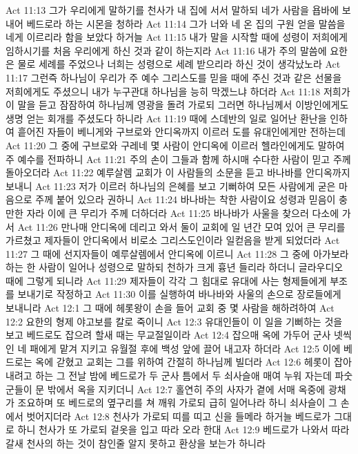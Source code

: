 Act 11:13  그가 우리에게 말하기를 천사가 내 집에 서서 말하되 네가 사람을 욥바에 보내어 베드로라 하는 시몬을 청하라
Act 11:14  그가 너와 네 온 집의 구원 얻을 말씀을 네게 이르리라 함을 보았다 하거늘
Act 11:15  내가 말을 시작할 때에 성령이 저희에게 임하시기를 처음 우리에게 하신 것과 같이 하는지라
Act 11:16  내가 주의 말씀에 요한은 물로 세례를 주었으나 너희는 성령으로 세례 받으리라 하신 것이 생각났노라
Act 11:17  그런즉 하나님이 우리가 주 예수 그리스도를 믿을 때에 주신 것과 같은 선물을 저희에게도 주셨으니 내가 누구관대 하나님을 능히 막겠느냐 하더라
Act 11:18  저희가 이 말을 듣고 잠잠하여 하나님께 영광을 돌려 가로되 그러면 하나님께서 이방인에게도 생명 얻는 회개를 주셨도다 하니라
Act 11:19  때에 스데반의 일로 일어난 환난을 인하여 흩어진 자들이 베니게와 구브로와 안디옥까지 이르러 도를 유대인에게만 전하는데
Act 11:20  그 중에 구브로와 구레네 몇 사람이 안디옥에 이르러 헬라인에게도 말하여 주 예수를 전파하니
Act 11:21  주의 손이 그들과 함께 하시매 수다한 사람이 믿고 주께 돌아오더라
Act 11:22  예루살렘 교회가 이 사람들의 소문을 듣고 바나바를 안디옥까지 보내니
Act 11:23  저가 이르러 하나님의 은혜를 보고 기뻐하여 모든 사람에게 굳은 마음으로 주께 붙어 있으라 권하니
Act 11:24  바나바는 착한 사람이요 성령과 믿음이 충만한 자라 이에 큰 무리가 주께 더하더라
Act 11:25  바나바가 사울을 찾으러 다소에 가서
Act 11:26  만나매 안디옥에 데리고 와서 둘이 교회에 일 년간 모여 있어 큰 무리를 가르쳤고 제자들이 안디옥에서 비로소 그리스도인이라 일컫음을 받게 되었더라
Act 11:27  그 때에 선지자들이 예루살렘에서 안디옥에 이르니
Act 11:28  그 중에 아가보라 하는 한 사람이 일어나 성령으로 말하되 천하가 크게 흉년 들리라 하더니 글라우디오 때에 그렇게 되니라
Act 11:29  제자들이 각각 그 힘대로 유대에 사는 형제들에게 부조를 보내기로 작정하고
Act 11:30  이를 실행하여 바나바와 사울의 손으로 장로들에게 보내니라
Act 12:1  그 때에 헤롯왕이 손을 들어 교회 중 몇 사람을 해하려하여
Act 12:2  요한의 형제 야고보를 칼로 죽이니
Act 12:3  유대인들이 이 일을 기뻐하는 것을 보고 베드로도 잡으려 할새 때는 무교절일이라
Act 12:4  잡으매 옥에 가두어 군사 넷씩인 네 패에게 맡겨 지키고 유월절 후에 백성 앞에 끌어 내고자 하더라
Act 12:5  이에 베드로는 옥에 갇혔고 교회는 그를 위하여 간절히 하나님께 빌더라
Act 12:6  헤롯이 잡아 내려고 하는 그 전날 밤에 베드로가 두 군사 틈에서 두 쇠사슬애 매여 누워 자는데 파숫군들이 문 밖에서 옥을 지키더니
Act 12:7  홀연히 주의 사자가 곁에 서매 옥중에 광채가 조요하며 또 베드로의 옆구리를 쳐 깨워 가로되 급히 일어나라 하니 쇠사슬이 그 손에서 벗어지더라
Act 12:8  천사가 가로되 띠를 띠고 신을 들메라 하거늘 베드로가 그대로 하니 천사가 또 가로되 겉옷을 입고 따라 오라 한대
Act 12:9  베드로가 나와서 따라갈새 천사의 하는 것이 참인줄 알지 못하고 환상을 보는가 하니라
